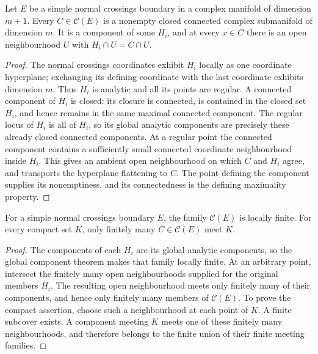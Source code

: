 \begin{lemma}
\label{hir:connected-boundary-component-geometry}
\leanok
Let \(E\) be a simple normal crossings boundary in a complex manifold of
dimension \(m+1\). Every \(C\in\mathcal C(E)\) is a nonempty closed connected
complex submanifold of dimension \(m\). It is a component of some \(H_i\),
and at every \(x\in C\) there is an open neighbourhood \(U\) with
\(H_i\cap U=C\cap U\).
\end{lemma}
\begin{proof}
The normal crossings coordinates exhibit \(H_i\) locally as one coordinate
hyperplane; exchanging its defining coordinate with the last coordinate
exhibits dimension \(m\). Thus \(H_i\) is analytic and all its points are
regular. A connected component of \(H_i\) is closed: its closure is connected,
is contained in the closed set \(H_i\), and hence remains in the same maximal
connected component. The regular locus of \(H_i\) is all of \(H_i\), so its
global analytic components are precisely these already closed connected
components. At a regular point the connected component contains a sufficiently
small connected coordinate neighbourhood inside \(H_i\). This gives an
ambient open neighbourhood on which \(C\) and \(H_i\) agree, and transports
the hyperplane flattening to \(C\). The point defining the component supplies
its nonemptiness, and its connectedness is the defining maximality property.
\end{proof}

\begin{lemma}
\label{hir:connected-boundary-components-locally-finite}
\leanok
For a simple normal crossings boundary \(E\), the family \(\mathcal C(E)\)
is locally finite. For every compact set \(K\), only finitely many
\(C\in\mathcal C(E)\) meet \(K\).
\end{lemma}
\begin{proof}
The components of each \(H_i\) are its global analytic components, so the
global component theorem makes that family locally finite. At an arbitrary
point, intersect the finitely many open neighbourhoods supplied for the
original members \(H_i\). The resulting open neighbourhood meets only finitely
many of their components, and hence only finitely many members of
\(\mathcal C(E)\). To prove the compact assertion, choose such a neighbourhood
at each point of \(K\). A finite subcover exists. A component meeting \(K\)
meets one of these finitely many neighbourhoods, and therefore belongs to the
finite union of their finite meeting families.
\end{proof}

